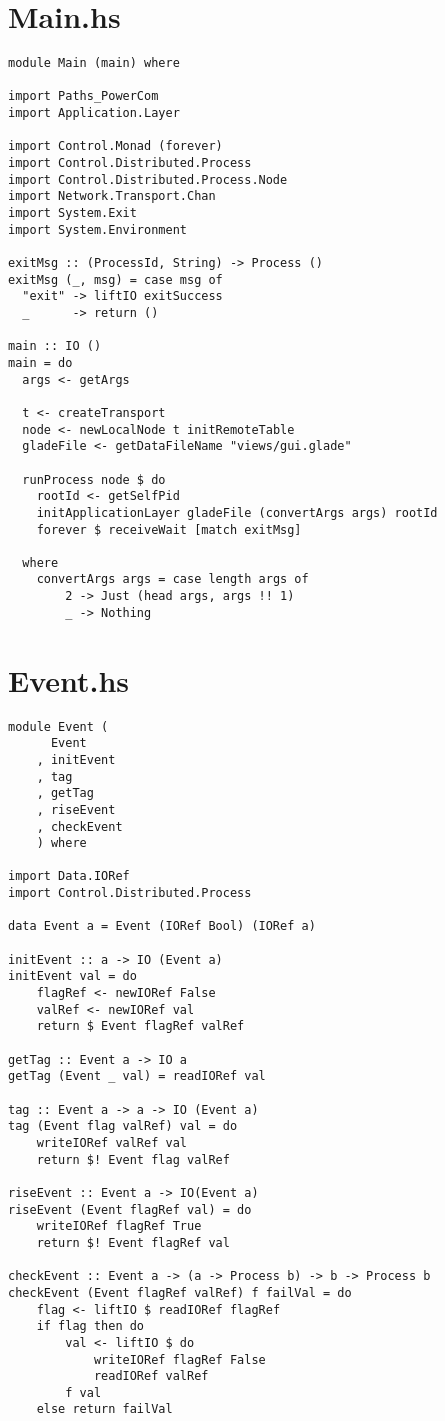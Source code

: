 \documentclass[russian,utf8,simple,emptystyle]{eskdtext}
\begin{document}
\maketitle
\tableofcontents
\newpage

\section{Main.hs}
\begin{lstlisting}
module Main (main) where

import Paths_PowerCom
import Application.Layer

import Control.Monad (forever)
import Control.Distributed.Process
import Control.Distributed.Process.Node
import Network.Transport.Chan
import System.Exit
import System.Environment

exitMsg :: (ProcessId, String) -> Process ()
exitMsg (_, msg) = case msg of
  "exit" -> liftIO exitSuccess
  _      -> return ()

main :: IO ()
main = do
  args <- getArgs

  t <- createTransport
  node <- newLocalNode t initRemoteTable
  gladeFile <- getDataFileName "views/gui.glade"

  runProcess node $ do 
    rootId <- getSelfPid
    initApplicationLayer gladeFile (convertArgs args) rootId 
    forever $ receiveWait [match exitMsg]
    
  where 
    convertArgs args = case length args of
        2 -> Just (head args, args !! 1)
        _ -> Nothing
\end{lstlisting}

\section{Event.hs}
\begin{lstlisting}
module Event (
      Event
    , initEvent
    , tag
    , getTag
    , riseEvent
    , checkEvent
    ) where

import Data.IORef
import Control.Distributed.Process

data Event a = Event (IORef Bool) (IORef a)

initEvent :: a -> IO (Event a)
initEvent val = do
    flagRef <- newIORef False
    valRef <- newIORef val
    return $ Event flagRef valRef

getTag :: Event a -> IO a 
getTag (Event _ val) = readIORef val

tag :: Event a -> a -> IO (Event a)
tag (Event flag valRef) val = do
    writeIORef valRef val 
    return $! Event flag valRef

riseEvent :: Event a -> IO(Event a)
riseEvent (Event flagRef val) = do 
    writeIORef flagRef True
    return $! Event flagRef val

checkEvent :: Event a -> (a -> Process b) -> b -> Process b 
checkEvent (Event flagRef valRef) f failVal = do
    flag <- liftIO $ readIORef flagRef
    if flag then do
        val <- liftIO $ do 
            writeIORef flagRef False
            readIORef valRef
        f val 
    else return failVal
\end{lstlisting}
\end{document}
